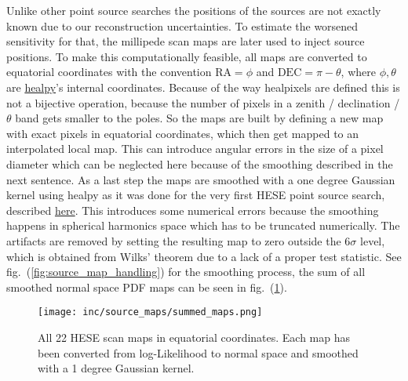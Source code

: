 Unlike other point source searches the positions of the sources are not exactly known due to our reconstruction uncertainties.
To estimate the worsened sensitivity for that, the millipede scan maps are later used to inject source positions.
To make this computationally feasible, all maps are converted to equatorial coordinates with the convention $\mathrm{RA} = \phi$ and $\mathrm{DEC} = \pi - \theta$, where $\phi, \theta$ are \href{https://healpy.readthedocs.io/en/latest/}{healpy}'s internal coordinates.
Because of the way healpixels are defined this is not a bijective operation, because the number of pixels in a zenith / declination / $\theta$ band gets smaller to the poles.
So the maps are built by defining a new map with exact pixels in equatorial coordinates, which then get mapped to an interpolated local map.
This can introduce angular errors in the size of a pixel diameter which can be neglected here because of the smoothing described in the next sentence.
As a last step the maps are smoothed with a one degree Gaussian kernel using healpy as it was done for the very first HESE point source search, described \href{https://wiki.icecube.wisc.edu/index.php/High-Energy_Starting_Event_Point_Source_Searches#Effects_of_Binning.2C_Rotation.2C_and_Smoothing}{here}.
This introduces some numerical errors because the smoothing happens in spherical harmonics space which has to be truncated numerically.
The artifacts are removed by setting the resulting map to zero outside the $6\sigma$ level, which is obtained from Wilks' theorem due to a lack of a proper test statistic.
See fig.~(\ref{fig:source_map_handling}) for the smoothing process, the sum of all smoothed normal space PDF maps can be seen in fig.~(\ref{fig:hese_maps_all}).

\begin{figure}[htbp]
  \centering
  \texttt{[image: inc/source\_maps/summed\_maps.png]}
  \caption{All 22 HESE scan maps in equatorial coordinates. Each map has been converted from log-Likelihood to normal space and smoothed with a 1 degree Gaussian kernel.}
  \label{fig:hese_maps_all}
\end{figure}

